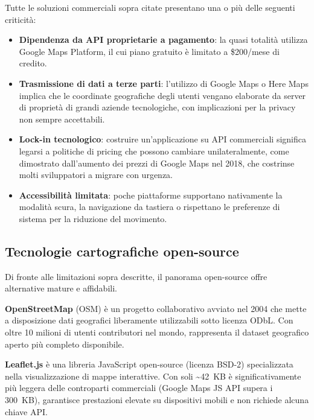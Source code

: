 \documentclass[12pt, a4paper]{article}
\begin{document}
Tutte le soluzioni commerciali sopra citate presentano una o più delle seguenti criticità:

\begin{itemize}
    \item \textbf{Dipendenza da API proprietarie a pagamento}: la quasi totalità utilizza
    Google Maps Platform, il cui piano gratuito è limitato a \$200/mese di credito.

    \item \textbf{Trasmissione di dati a terze parti}: l'utilizzo di Google Maps o Here Maps
    implica che le coordinate geografiche degli utenti vengano elaborate da server di
    proprietà di grandi aziende tecnologiche, con implicazioni per la privacy non sempre
    accettabili.

    \item \textbf{Lock-in tecnologico}: costruire un'applicazione su API commerciali
    significa legarsi a politiche di pricing che possono cambiare unilateralmente, come
    dimostrato dall'aumento dei prezzi di Google Maps nel 2018, che costrinse molti
    sviluppatori a migrare con urgenza.

    \item \textbf{Accessibilità limitata}: poche piattaforme supportano nativamente
    la modalità scura, la navigazione da tastiera o rispettano le preferenze di sistema
    per la riduzione del movimento.
\end{itemize}

\subsection{Tecnologie cartografiche open-source}

Di fronte alle limitazioni sopra descritte, il panorama open-source offre alternative
mature e affidabili.

\textbf{OpenStreetMap} (OSM) è un progetto collaborativo avviato nel 2004 che mette a
disposizione dati geografici liberamente utilizzabili sotto licenza ODbL. Con oltre
10 milioni di utenti contributori nel mondo, rappresenta il dataset geografico aperto
più completo disponibile.

\textbf{Leaflet.js} è una libreria JavaScript open-source (licenza BSD-2) specializzata
nella visualizzazione di mappe interattive. Con soli \textasciitilde 42~KB è significativamente più leggera delle controparti commerciali (Google Maps JS API supera
i 300~KB), garantisce prestazioni elevate su dispositivi mobili e non richiede
alcuna chiave API.
\end{document}
